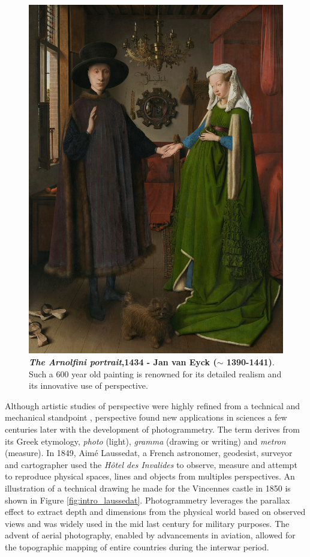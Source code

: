 \begin{figure}[htp!]
      \begin{center}
      \includegraphics[width=\textwidth]{images/introduction/The_Arnolfini_portrait.jpg}
      \end{center}
      \caption{\textbf{\textit{The Arnolfini portrait},1434 - Jan van Eyck ($\sim$ 1390-1441)}. Such a 600 year old painting is renowned for its detailed realism and its innovative use of perspective.}
      \label{fig:arnolfini}
\end{figure}

Although artistic studies of perspective were highly refined from a technical and mechanical standpoint \citep{simon2021jan}, perspective found new applications in sciences a few centuries later with the development of photogrammetry. The term derives from its Greek etymology, \textit{photo} (\ie light), \textit{gramma} (\ie drawing or writing) and \textit{metron} (\ie measure). In 1849, Aimé Laussedat, a French astronomer, geodesist, surveyor and cartographer used the \textit{Hôtel des Invalides} to observe, measure and attempt to reproduce physical spaces, lines and objects from multiples perspectives. An illustration of a technical drawing he made for the Vincennes castle in 1850 is shown in Figure \ref{fig:intro_laussedat}. Photogrammetry leverages the parallax effect to extract depth and dimensions from the physical world based on observed views and was widely used in the mid last century for military purposes. The advent of aerial photography, enabled by advancements in aviation, allowed for the topographic mapping of entire countries during the interwar period.

